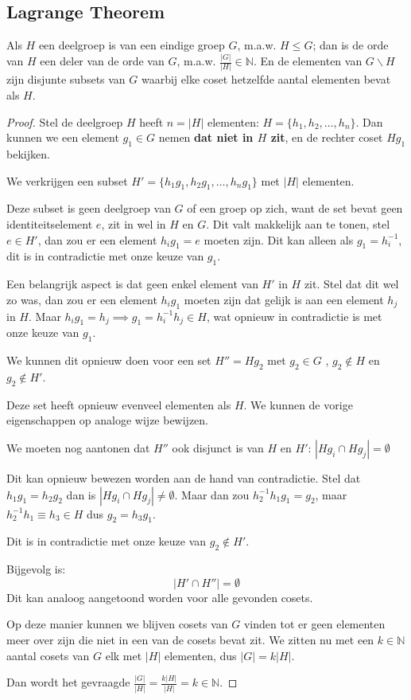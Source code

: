 \subsection{Lagrange Theorem}

\begin{theorem}
    Als \(H\) een deelgroep is van een eindige groep \(G\), m.a.w. \(H \leq G\); dan is de orde van \(H\) een deler van de orde van \(G\), m.a.w. \(\frac{|G|}{|H|} \in \mathbb{N}\).
    En de elementen van \(G\backslash H\) zijn disjunte subsets van \(G\) waarbij elke coset hetzelfde aantal elementen bevat als \(H\).
\end{theorem}
\begin{proof}
    Stel de deelgroep \(H\) heeft \(n = |H|\) elementen: \(H = \{h_1, h_2, \ldots, h_n\}\).
    Dan kunnen we een element \(g_1 \in G\) nemen \textbf{dat niet in \(H\) zit}, en de rechter coset \(Hg_1\) bekijken.

    We verkrijgen een subset \(H' = \{h_1g_1, h_2g_1, \ldots, h_n g_1 \}\) met \(|H|\) elementen.

    Deze subset is geen deelgroep van \(G\) of een groep op zich, want de set bevat geen identiteitselement \(e\), zit in wel in \(H\) en \(G\).
    Dit valt makkelijk aan te tonen, stel \(e \in H'\), dan zou er een element \(h_ig_1 = e\) moeten zijn. Dit kan alleen als \(g_1 = h_i^{-1}\), dit is in contradictie met onze keuze van \(g_1\).

    Een belangrijk aspect is dat geen enkel element van \(H'\) in \(H\) zit.
    Stel dat dit wel zo was, dan zou er een element \(h_ig_1\) moeten zijn dat gelijk is aan een element \(h_j\) in \(H\).
    Maar \(h_ig_1 = h_j \implies g_1 = h_i^{-1}h_j \in H\), wat opnieuw in contradictie is met onze keuze van \(g_1\).

    We kunnen dit opnieuw doen voor een set \(H''=Hg_2\) met \(g_2 \in G\) , \(g_2 \notin H\) en \(g_2 \notin H'\).

    Deze set heeft opnieuw evenveel elementen als \(H\).
    We kunnen de vorige eigenschappen op analoge wijze bewijzen.

    We moeten nog aantonen dat \(H''\) ook disjunct is van \(H\) en \(H'\): \(|Hg_i \cap Hg_j| = \emptyset\)

    Dit kan opnieuw bewezen worden aan de hand van contradictie. Stel dat \(h_1g_1 = h_2g_2 \) dan is \(|Hg_i \cap Hg_j| \neq \emptyset\).
    Maar dan zou \(h_2^{-1}h_1g_1 = g_2\), maar \(h_2^{-1}h_1 \equiv h_3 \in H\) dus \(g_2 = h_3g_1 \).

    Dit is in contradictie met onze keuze van \(g_2 \notin H'\).

    Bijgevolg is:
    \[
    |H' \cap H''| = \emptyset
    \]
    Dit kan analoog aangetoond worden voor alle gevonden cosets.

    Op deze manier kunnen we blijven cosets van \(G\) vinden tot er geen elementen meer over zijn die niet in een van de cosets bevat zit. We zitten nu met een \(k \in \mathbb{N}\) aantal cosets van \(G\)
    elk met \(|H|\) elementen, dus \(|G| = k|H|\).

    Dan wordt het gevraagde \(\frac{|G|}{|H|} = \frac{k |H| }{|H|} = k \in \mathbb{N}\).


\end{proof}
